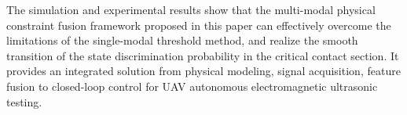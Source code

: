 \begin{englishabstract}
The simulation and experimental results show that the multi-modal physical constraint fusion framework proposed in this paper can effectively overcome the limitations of the single-modal threshold method, and realize the smooth transition of the state discrimination probability in the critical contact section. It provides an integrated solution from physical modeling, signal acquisition, feature fusion to closed-loop control for UAV autonomous electromagnetic ultrasonic testing.

\end{englishabstract}